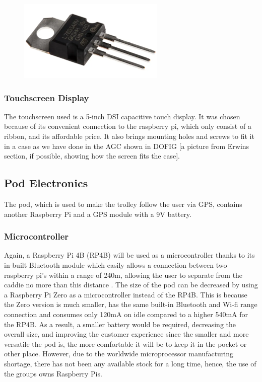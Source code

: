 \documentclass[11pt,landscape]{article}
\begin{document}
\begin{multicols}{3}
\begin{figure}[H]
    \begin{center}
        \includegraphics[]{voltage_regulator}
        \label{fig:voltage_regulator}
        \end{center}
\end{figure}

\subsubsection{Touchscreen Display}
The touchscreen used is a 5-inch DSI capacitive touch display. It was chosen
because of its convenient connection to the raspberry pi, which only consist of
a ribbon, and its affordable price. It also brings mounting holes and screws to
fit it in a case as we have done in the AGC shown in DOFIG [a picture from Erwins
section, if possible, showing how the screen fits the case]. 

\subsection{Pod Electronics}
The pod, which is used to make the trolley follow the user via GPS, contains
another Raspberry Pi and a GPS module with a 9V battery.
\subsubsection{Microcontroller}
Again, a Raspberry Pi 4B (RP4B) will be used as a microcontroller thanks to its
in-built Bluetooth module which easily allows a connection between two raspberry
pi’s within a range of 240m, allowing the user to separate from the caddie no
more than this distance \cite{raspi}.
The size of the pod can be decreased by using a Raspberry Pi Zero as a
microcontroller instead of the RP4B. This is because the Zero version is much
smaller, has the same built-in Bluetooth and Wi-fi range connection and consumes
only 120mA on idle compared to a higher 540mA for the RP4B. As a result, a
smaller battery would be required, decreasing the overall size, and improving
the customer experience since the smaller and more versatile the pod is, the
more comfortable it will be to keep it in the pocket or other place. However,
due to the worldwide microprocessor manufacturing shortage, there has not been
any available stock for a long time, hence, the use of the groups owns Raspberry
Pis. 


\end{multicols}
\end{document}
